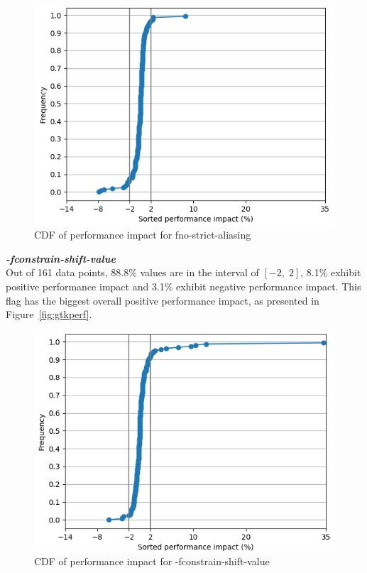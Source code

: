 \documentclass{sciposter}
\begin{document}
\begin{multicols}{3}
\begin{figure}[h!]
\centering
\includegraphics[scale=1.2]{fno-strict-aliasing}
\caption{CDF of performance impact for fno-strict-aliasing}
\end{figure}

\textbf{\textit{-fconstrain-shift-value}} \\
Out of 161 data points, 88.8\% values are in the interval of \( [-2,\;2] \), 
8.1\% exhibit positive performance impact and 3.1\% exhibit negative
performance impact. This flag has the biggest overall positive 
performance impact, as presented in Figure~\ref{fig:gtkperf}.

\begin{figure}[h!]
\centering
\includegraphics[scale=1.2]{fconstrain-shift-value}
\caption{CDF of performance impact for -fconstrain-shift-value}
\end{figure}


\end{multicols}
\end{document}
